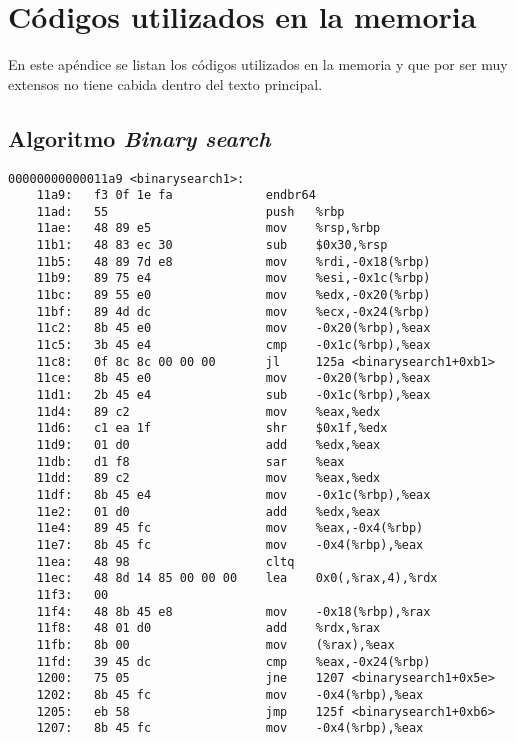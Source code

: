 \chapter{Códigos utilizados en la memoria}
\label{apen:codigos}

En este apéndice se listan los códigos utilizados en la memoria y que por ser
muy extensos no tiene cabida dentro del texto principal.

\section{Algoritmo \textit{Binary search}}
\label{apensec:binarySearch}

\begin{mycode}
    \begin{verbatim}
00000000000011a9 <binarysearch1>:
    11a9:	f3 0f 1e fa          	endbr64
    11ad:	55                   	push   %rbp
    11ae:	48 89 e5             	mov    %rsp,%rbp
    11b1:	48 83 ec 30          	sub    $0x30,%rsp
    11b5:	48 89 7d e8          	mov    %rdi,-0x18(%rbp)
    11b9:	89 75 e4             	mov    %esi,-0x1c(%rbp)
    11bc:	89 55 e0             	mov    %edx,-0x20(%rbp)
    11bf:	89 4d dc             	mov    %ecx,-0x24(%rbp)
    11c2:	8b 45 e0             	mov    -0x20(%rbp),%eax
    11c5:	3b 45 e4             	cmp    -0x1c(%rbp),%eax
    11c8:	0f 8c 8c 00 00 00    	jl     125a <binarysearch1+0xb1>
    11ce:	8b 45 e0             	mov    -0x20(%rbp),%eax
    11d1:	2b 45 e4             	sub    -0x1c(%rbp),%eax
    11d4:	89 c2                	mov    %eax,%edx
    11d6:	c1 ea 1f             	shr    $0x1f,%edx
    11d9:	01 d0                	add    %edx,%eax
    11db:	d1 f8                	sar    %eax
    11dd:	89 c2                	mov    %eax,%edx
    11df:	8b 45 e4             	mov    -0x1c(%rbp),%eax
    11e2:	01 d0                	add    %edx,%eax
    11e4:	89 45 fc             	mov    %eax,-0x4(%rbp)
    11e7:	8b 45 fc             	mov    -0x4(%rbp),%eax
    11ea:	48 98                	cltq
    11ec:	48 8d 14 85 00 00 00 	lea    0x0(,%rax,4),%rdx
    11f3:	00 
    11f4:	48 8b 45 e8          	mov    -0x18(%rbp),%rax
    11f8:	48 01 d0             	add    %rdx,%rax
    11fb:	8b 00                	mov    (%rax),%eax
    11fd:	39 45 dc             	cmp    %eax,-0x24(%rbp)
    1200:	75 05                	jne    1207 <binarysearch1+0x5e>
    1202:	8b 45 fc             	mov    -0x4(%rbp),%eax
    1205:	eb 58                	jmp    125f <binarysearch1+0xb6>
    1207:	8b 45 fc             	mov    -0x4(%rbp),%eax

\end{verbatim}
\end{mycode}
